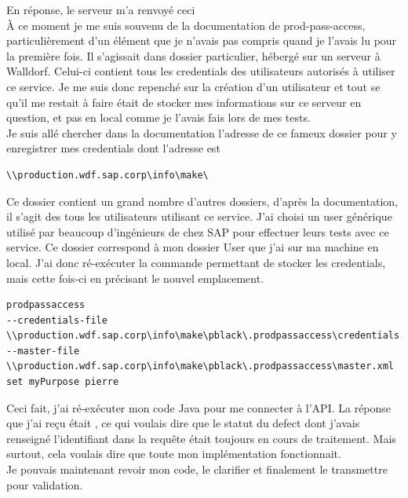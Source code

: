 En réponse, le serveur m'a renvoyé ceci \\


\`{A} ce moment je me suis souvenu de la documentation de prod-pass-access, particulièrement d'un élément que je n'avais pas compris quand je l'avais lu pour la première fois. Il s'agissait dans dossier particulier, hébergé sur un serveur à Walldorf. Celui-ci contient tous les credentials des utilisateurs autorisés à utiliser ce service. Je me suis donc repenché sur la création d'un utilisateur et tout se qu'il me restait à faire était de stocker mes informations sur ce serveur en question, et pas en local comme je l'avais fais lors de mes tests.\\
Je suis allé chercher dans la documentation l'adresse de ce fameux dossier pour y enregistrer mes credentials dont l'adresse est 

\begin{lstlisting}
\\production.wdf.sap.corp\info\make\
\end{lstlisting}

Ce dossier contient un grand nombre d'autres dossiers, d'après la documentation, il s'agit des tous les utilisateurs utilisant ce service. J'ai choisi un user générique  utilisé par beaucoup d'ingénieurs de chez SAP pour effectuer leurs tests avec ce service. Ce dossier correspond à mon dossier User que j'ai sur ma machine en local. J'ai donc ré-exécuter la commande permettant de stocker les credentials, mais cette fois-ci en précisant le nouvel emplacement.
\begin{lstlisting}
prodpassaccess 
--credentials-file \\production.wdf.sap.corp\info\make\pblack\.prodpassaccess\credentials.properties 
--master-file \\production.wdf.sap.corp\info\make\pblack\.prodpassaccess\master.xml 
set myPurpose pierre 
\end{lstlisting}

Ceci fait, j'ai ré-exécuter mon code \gls{Java} pour me connecter à l'API. La réponse que j'ai reçu était , ce qui voulais dire que le statut du defect dont j'avais renseigné l'identifiant dans la requête était toujours en cours de traitement. Mais surtout, cela voulais dire que toute mon implémentation fonctionnait. \\
Je pouvais maintenant revoir mon code, le clarifier et finalement le transmettre pour validation.\\


